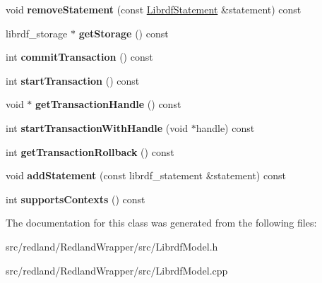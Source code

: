 \begin{DoxyCompactItemize}
\mbox{\label{classredland_1_1LibrdfModel_a2cd4394b2c4fee69ce557eafd585c243}} 
void {\bfseries remove\+Statement} (const \hyperlink{classredland_1_1LibrdfStatement}{Librdf\+Statement} \&statement) const
\item 
\mbox{\label{classredland_1_1LibrdfModel_a6c40f1adbd292e5278ee6db5db356b34}} 
librdf\+\_\+storage $\ast$ {\bfseries get\+Storage} () const
\item 
\mbox{\label{classredland_1_1LibrdfModel_a21ddc6bf105a14ed3ad2a3bdfaf8c23d}} 
int {\bfseries commit\+Transaction} () const
\item 
\mbox{\label{classredland_1_1LibrdfModel_ac869cf4095da3cc748b52e30d6b5a95b}} 
int {\bfseries start\+Transaction} () const
\item 
\mbox{\label{classredland_1_1LibrdfModel_ac6734571f6488dbabd4fdab2640f49b3}} 
void $\ast$ {\bfseries get\+Transaction\+Handle} () const
\item 
\mbox{\label{classredland_1_1LibrdfModel_a65b5be3bf67ef89173df06fc6190334e}} 
int {\bfseries start\+Transaction\+With\+Handle} (void $\ast$handle) const
\item 
\mbox{\label{classredland_1_1LibrdfModel_abf9471d407147d24bbbda8c200d92791}} 
int {\bfseries get\+Transaction\+Rollback} () const
\item 
\mbox{\label{classredland_1_1LibrdfModel_a3699be0e707d05cfabd88e31240707c4}} 
void {\bfseries add\+Statement} (const librdf\+\_\+statement \&statement) const
\item 
\mbox{\label{classredland_1_1LibrdfModel_a64915c9b196d061d1547f9a659177ea9}} 
int {\bfseries supports\+Contexts} () const
\end{DoxyCompactItemize}


The documentation for this class was generated from the following files\+:\begin{DoxyCompactItemize}
\item 
src/redland/\+Redland\+Wrapper/src/Librdf\+Model.\+h\item 
src/redland/\+Redland\+Wrapper/src/Librdf\+Model.\+cpp\end{DoxyCompactItemize}

